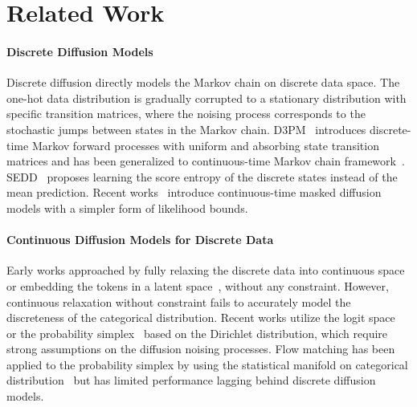 \section{Related Work}
\paragraph{Discrete Diffusion Models}
Discrete diffusion directly models the Markov chain on discrete data space. The one-hot data distribution is gradually corrupted to a stationary distribution with specific transition matrices, where the noising process corresponds to the stochastic jumps between states in the Markov chain.
D3PM~\citep{austin2021d3pm} introduces discrete-time Markov forward processes with uniform and absorbing state transition matrices and has been generalized to continuous-time Markov chain framework~\citep{campbell2022ctmc}.
SEDD~\citep{lou2024sedd} proposes learning the score entropy of the discrete states instead of the mean prediction. 
Recent works~\citep{shi2024md4,sahoo2024simple} introduce continuous-time masked diffusion models with a simpler form of likelihood bounds.




\paragraph{Continuous Diffusion Models for Discrete Data}
Early works approached by fully relaxing the discrete data into continuous space~\citep{han2022ssd} or embedding the tokens in a latent space~\citep{li2022diffusion,dieleman2022continuous}, without any constraint.
However, continuous relaxation without constraint fails to accurately model the discreteness of the categorical distribution.
Recent works utilize the logit space~\citep{hoogeboom2021multinomial,graves2023bayesian} or the probability simplex~\citep{avdeyev2023dirichlet,stark2024dirichlet} based on the Dirichlet distribution, which require strong assumptions on the diffusion noising processes.
Flow matching has been applied to the probability simplex by using the statistical manifold on categorical distribution~\citep{cheng2024categorical,davis2024fisherflow} but has limited performance lagging behind discrete diffusion models.



